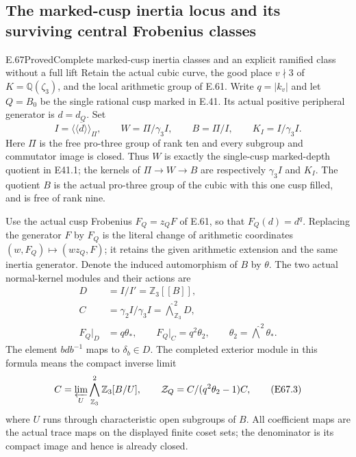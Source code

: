 \subsection{The marked-cusp inertia locus and its surviving central Frobenius classes}

\begin{statement}{E.67}{Proved}{Complete marked-cusp inertia classes and an explicit ramified class without a full lift}
Retain the actual cubic curve, the good place $v\nmid3$ of
$K=\mathbb Q(\zeta_3)$, and the local arithmetic group of E.61.
Write $q=|k_v|$ and let $Q=B_0$ be the single rational cusp
marked in E.41. Its actual positive peripheral generator is
$d=d_Q$. Set
\[
 I=\overline{\langle\!\langle d\rangle\!\rangle}_{\Pi},\qquad
 W=\Pi/\gamma_3I,\qquad B=\Pi/I,\qquad
 K_I=I/\gamma_3I.
 \tag{E67.1}
\]
Here $\Pi$ is the free pro-three group of rank ten and every
subgroup and commutator image is closed. Thus $W$ is exactly
the single-cusp marked-depth quotient in E41.1; the kernels
of $\Pi\to W\to B$ are respectively $\gamma_3I$ and $K_I$.
The quotient $B$ is the actual pro-three group of the cubic
with this one cusp filled, and is free of rank nine.

Use the actual cusp Frobenius $F_Q=z_QF$ of E.61, so that
$F_Q(d)=d^q$. Replacing the generator $F$ by $F_Q$ is the
literal change of arithmetic coordinates
$(w,F_Q)\mapsto(wz_Q,F)$; it retains the given arithmetic
extension and the same inertia generator. Denote the induced
automorphism of $B$ by $\theta$. The two actual normal-kernel
modules and their actions are
\[
 \begin{split}
 D&=I/I'=\mathbb Z_3[[B]],\\
 C&=\gamma_2I/\gamma_3I
       =\widehat{\bigwedge}^{2}_{\mathbb Z_3}D,\\
 F_Q|_D&=q\theta_*,\qquad
 F_Q|_C=q^2\theta_2,\qquad
 \theta_2=\widehat{\bigwedge}^{2}\theta_* .
 \end{split}
 \tag{E67.2}
\]
The element $bdb^{-1}$ maps to $\delta_b\in D$.
The completed exterior module in this formula means the
compact inverse limit
\[
 C=\varprojlim_U
       \bigwedge^2_{\mathbb Z_3}\mathbb Z_3[B/U],
 \qquad
 \mathcal Z_Q=C/(q^2\theta_2-1)C,
 \tag{E67.3}
\]
where $U$ runs through characteristic open subgroups of $B$.
All coefficient maps are the actual trace maps on the
displayed finite coset sets; the denominator is its compact
image and hence is already closed.


\end{statement}
